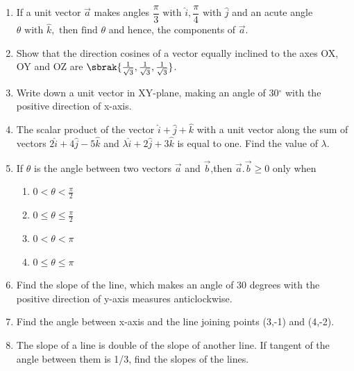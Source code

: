 \begin{enumerate}[label=\thesection.\arabic*,ref=\thesection.\theenumi]
	\\
		\solution
		
\item If a unit vector $\overrightarrow{a}$ makes angles $\dfrac{\pi}{3}\text{ with }\hat{i}, \dfrac{\pi}{4}\text{ with }\hat{j}$ and an acute angle $\theta \text{ with }\hat{k},\text{ then find } \theta$ and hence, the components of $\overrightarrow{a}$.
	\\
		\solution
		
\item Show that the direction cosines of a vector equally inclined to the axes OX, OY and OZ are \textpm $\sbrak{\frac{1}{\sqrt{3}},\frac{1}{\sqrt{3}},\frac{1}{\sqrt{3}}}$.\\
	\solution
		
\item Write down a unit vector in XY-plane, making an angle of 30$^{\circ}$ with the positive direction of x-axis.\\
\item The scalar product of the vector $\hat{i}+\hat{j}+\hat{k}$ with a unit vector along the sum of vectors $2\hat{i}+4\hat{j}-5\hat{k}$ and $\lambda\hat{i}+2\hat{j}+3\hat{k}$ is equal to one. Find the value of $\lambda$.
\item If $\theta$ is the angle between two vectors $\vec{a}$ and $\vec{b}$,then $\vec{a}.\vec{b}\geq0$ only when 
\begin{enumerate}
\item \label{itm:chapters/12/10/5/161} $0<\theta<\frac{\pi}{2}$
\item \label{itm:chapters/12/10/5/162} $0\le\theta\le\frac{\pi}{2}$
\item \label{itm:chapters/12/10/5/163} $0<\theta<\pi$
\item \label{itm:chapters/12/10/5/164} $0\le\theta\le\pi$
\end{enumerate}
	\solution
		
\item Find the slope of the line, which makes an angle of 30 degrees with the positive direction of y-axis measures anticlockwise.
\label{chapters/11/10/1/7}\\
\solution

\item Find the angle between x-axis and the line joining points (3,-1) and (4,-2).
\label{chapters/11/10/1/10}

	\item The slope of a line is double of the slope of another line. If tangent of the angle between them is 1/3, find the slopes of the lines.

\end{enumerate}
